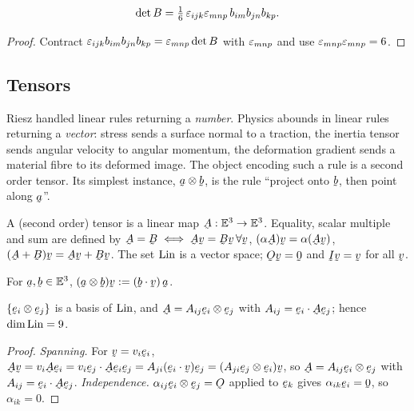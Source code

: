 \begin{corollary}\label{cor:det6}
\[\det B=\tfrac16\,\varepsilon_{ijk}\varepsilon_{mnp}\,b_{im}b_{jn}b_{kp}.\]
\end{corollary}

\begin{proof}
Contract $\varepsilon_{ijk}b_{im}b_{jn}b_{kp}=\varepsilon_{mnp}\det B$ with
$\varepsilon_{mnp}$ and use $\varepsilon_{mnp}\varepsilon_{mnp}=6$.
\end{proof}

\subsection{Tensors}\label{ss:tensor}

Riesz handled linear rules returning a \emph{number}. Physics abounds in
linear rules returning a \emph{vector}: stress sends a surface normal to a
traction, the inertia tensor sends angular velocity to angular momentum,
the deformation gradient sends a material fibre to its deformed image. The
object encoding such a rule is a second order tensor. Its simplest instance,
$\ba\otimes\bb$, is the rule ``project onto $\bb$, then point along $\ba$''.

\begin{definition}[Tensor]\label{def:tensor}
A (second order) tensor is a linear map $\bA:\Et\to\Et$. Equality, scalar
multiple and sum are defined by $\bA=\bB\iff\bA\bv=\bB\bv\,\forall\bv$,
$(\alpha\bA)\bv=\alpha(\bA\bv)$, $(\bA+\bB)\bv=\bA\bv+\bB\bv$. The set $\operatorname{Lin}$
is a vector space; $\Ob\bv=\bze$ and $\I\bv=\bv$ for all $\bv$.
\end{definition}

\begin{definition}\label{def:tp}
For $\ba,\bb\in\Et$, $(\ba\otimes\bb)\bv:=(\ip\bb\bv)\,\ba$.
\end{definition}

\begin{theorem}\label{thm:comprep}
$\{\be_{i}\otimes\be_{j}\}$ is a basis of $\operatorname{Lin}$, and
$\bA=A_{ij}\be_{i}\otimes\be_{j}$ with $A_{ij}=\ip{\be_{i}}{\bA\be_{j}}$;
hence $\dim\operatorname{Lin}=9$.
\end{theorem}

\begin{proof}
\emph{Spanning.} For $\bv=v_{i}\be_{i}$,
$\bA\bv=v_{i}\bA\be_{i}=v_{i}\ip{\be_{j}}{\bA\be_{i}}\be_{j}
=A_{ji}(\ip{\be_{i}}\bv)\be_{j}=(A_{ji}\be_{j}\otimes\be_{i})\bv$, so
$\bA=A_{ij}\be_{i}\otimes\be_{j}$ with $A_{ij}=\ip{\be_{i}}{\bA\be_{j}}$.
\emph{Independence.} $\alpha_{ij}\be_{i}\otimes\be_{j}=\Ob$ applied to
$\be_{k}$ gives $\alpha_{ik}\be_{i}=\bze$, so $\alpha_{ik}=0$.
\end{proof}

